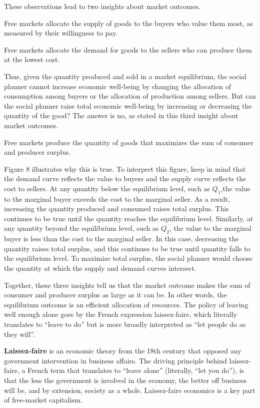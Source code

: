 These observations lead to two insights about market outcomes.
\bit
\item Free markets allocate the supply of goods to the buyers who value them most, as measured by their willingness to
pay.
\item Free markets allocate the demand for goods to the sellers who can produce them at the lowest cost.
\eit

Thus, given the quantity produced and sold in a market equilibrium, the social planner cannot increase economic
well-being by changing the allocation of consumption among buyers or the allocation of production among sellers. But
can the social planner raise total economic well-being by increasing or decreasing the quantity of the good? The
answer is no, as stated in this third insight about market outcomes.
\bit
\item Free markets produce the quantity of goods that maximizes the sum of consumer and producer surplus.
\eit

Figure 8 illustrates why this is true. To interpret this figure, keep in mind that the demand curve reflects the
value to buyers and the supply curve reflects the cost to sellers. At any quantity below the equilibrium level, such
as $Q_1$,the value to the marginal buyer exceeds the cost to the marginal seller. As a result, increasing the
quantity produced and consumed raises total surplus. This continues to be true until the quantity reaches the
equilibrium level. Similarly, at any quantity beyond the equilibrium level, such as $Q_2$, the value to the marginal
buyer is less than the cost to the marginal seller. In this case, decreasing the quantity raises total surplus, and
this continues to be true until quantity falls to the equilibrium level. To maximize total surplus, the social
planner would choose the quantity at which the supply and demand curves intersect.


Together, these three insights tell us that the market outcome makes the sum of consumer and producer surplus as
large as it can be. In other words, the equilibrium outcome is an efficient allocation of resources. The policy of
leaving well enough alone goes by the French expression laissez-faire, which literally translates to ``leave to do''
but is more broadly interpreted as ``let people do as they will''.

\textbf{Laissez-faire} is an economic theory from the 18th century that opposed any government intervention in
business affairs. The driving principle behind laissez-faire, a French term that translates to ``leave alone''
(literally, ``let you do''), is that the less the government is involved in the economy, the better off business will
be, and by extension, society as a whole. Laissez-faire economics is a key part of free-market capitalism.
\ed

